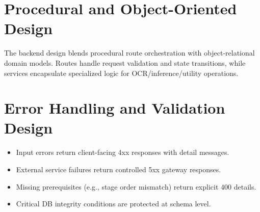 \section{Procedural and Object-Oriented Design}
The backend design blends procedural route orchestration with object-relational domain models. Routes handle request validation and state transitions, while services encapsulate specialized logic for OCR/inference/utility operations.

\section{Error Handling and Validation Design}
\begin{itemize}
\item Input errors return client-facing 4xx responses with detail messages.
\item External service failures return controlled 5xx gateway responses.
\item Missing prerequisites (e.g., stage order mismatch) return explicit 400 details.
\item Critical DB integrity conditions are protected at schema level.
\end{itemize}

